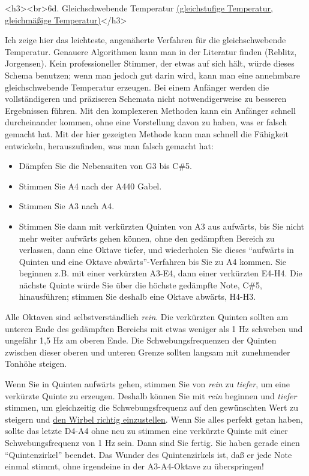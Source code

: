 \label{c2_6d}
\label{c2_6_et}

<h3><br>6d. Gleichschwebende Temperatur \hyperref[et]{(gleichstufige Temperatur, gleichmäßige
 Temperatur)}</h3>

Ich zeige hier das leichteste, angenäherte Verfahren für die gleichschwebende Temperatur.
Genauere Algorithmen kann man in der Literatur finden (Reblitz, Jorgensen).
Kein professioneller Stimmer, der etwas auf sich hält, würde dieses Schema benutzen; wenn man jedoch gut darin wird, kann man eine annehmbare gleichschwebende Temperatur erzeugen.
Bei einem Anfänger werden die vollständigeren und präziseren Schemata nicht notwendigerweise zu besseren Ergebnissen führen.
Mit den komplexeren Methoden kann ein Anfänger schnell durcheinander kommen, ohne eine Vorstellung davon zu haben, was er falsch gemacht hat.
Mit der hier gezeigten Methode kann man schnell die Fähigkeit entwickeln, herauszufinden, was man falsch gemacht hat:

\begin{itemize} 
 \item Dämpfen Sie die Nebensaiten von G3 bis C\#5.
 \item Stimmen Sie A4 nach der A440 Gabel.
 \item Stimmen Sie A3 nach A4.
 \item Stimmen Sie dann mit verkürzten Quinten von A3 aus aufwärts, bis Sie nicht mehr weiter aufwärts gehen können, ohne den gedämpften Bereich zu verlassen, dann eine Oktave tiefer, und wiederholen Sie dieses \enquote{aufwärts in Quinten und eine Oktave abwärts}-Verfahren bis Sie zu A4 kommen.
Sie beginnen z.B. mit einer verkürzten A3-E4, dann einer verkürzten E4-H4.
Die nächste Quinte würde Sie über die höchste gedämpfte Note, C\#5, hinausführen; stimmen Sie deshalb eine Oktave abwärts, H4-H3.
\end{itemize}

Alle Oktaven sind selbstverständlich \textit{rein}.
Die verkürzten Quinten sollten am unteren Ende des gedämpften Bereichs mit etwas weniger als 1 Hz schweben und ungefähr 1,5 Hz am oberen Ende.
Die Schwebungsfrequenzen der Quinten zwischen dieser oberen und unteren Grenze sollten langsam mit zunehmender Tonhöhe steigen.

Wenn Sie in Quinten aufwärts gehen, stimmen Sie von \textit{rein} zu \textit{tiefer}, um eine verkürzte Quinte zu erzeugen.
Deshalb können Sie mit \textit{rein} beginnen und \textit{tiefer} stimmen, um gleichzeitig die Schwebungsfrequenz auf den gewünschten Wert zu steigern und \hyperref[c2_5_wirb]{den Wirbel richtig einzustellen}.
Wenn Sie alles perfekt getan haben, sollte das letzte D4-A4 ohne neu zu stimmen eine verkürzte Quinte mit einer Schwebungsfrequenz von 1 Hz sein.
Dann sind Sie fertig.
Sie haben gerade einen \enquote{Quintenzirkel} beendet.
Das Wunder des Quintenzirkels ist, daß er jede Note einmal stimmt, ohne irgendeine in der A3-A4-Oktave zu überspringen!

